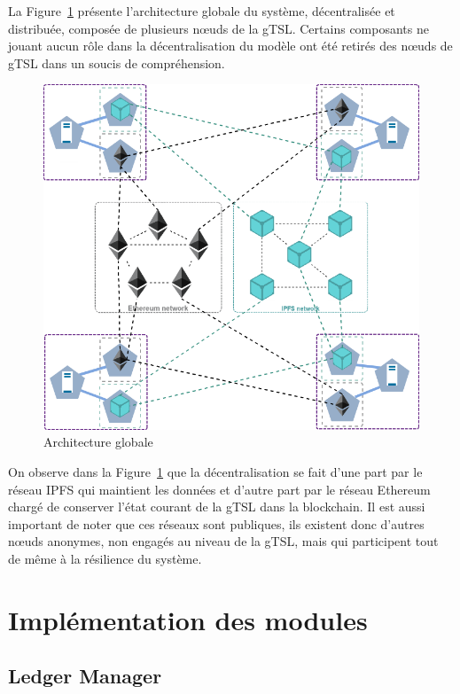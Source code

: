 \documentclass{tnreport}
\begin{document}
La Figure~\ref{fig:architecture-global} présente l'architecture globale du système, décentralisée et distribuée, composée de plusieurs nœuds de la gTSL. Certains composants ne jouant aucun rôle dans la décentralisation du modèle ont été retirés des nœuds de gTSL dans un soucis de compréhension.
\clearpage

\begin{figure}[h]
	\centering
	\includegraphics[scale=0.58]{figures/architecture-global}
	\caption{Architecture globale}
	\label{fig:architecture-global}
\end{figure}

On observe dans la Figure~\ref{fig:architecture-global} que la décentralisation se fait d'une part par le réseau IPFS qui maintient les données et d'autre part par le réseau Ethereum chargé de conserver l'état courant de la gTSL dans la blockchain. Il est aussi important de noter que ces réseaux sont publiques, ils existent donc d'autres nœuds anonymes, non engagés au niveau de la gTSL, mais qui participent tout de même à la résilience du système.

\section{Implémentation des modules}

\subsection{Ledger Manager}
\label{sec:realisation-ledger}
\end{document}
